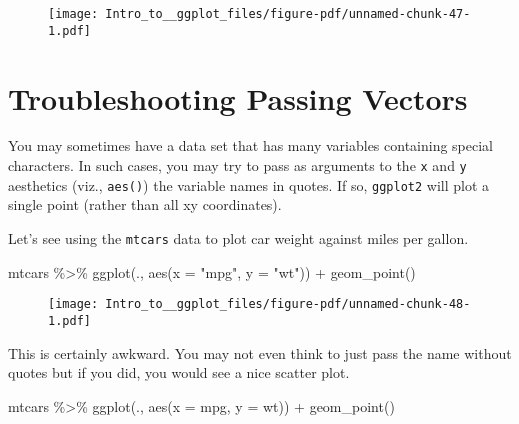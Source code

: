 \documentclass[
  letterpaper,
  DIV=11,
  numbers=noendperiod]{scrartcl}
\newenvironment{Shaded}{\begin{snugshade}}{\end{snugshade}}
\newcommand{\AttributeTok}[1]{\textcolor[rgb]{0.40,0.45,0.13}{#1}}
\newcommand{\FunctionTok}[1]{\textcolor[rgb]{0.28,0.35,0.67}{#1}}
\newcommand{\NormalTok}[1]{\textcolor[rgb]{0.00,0.23,0.31}{#1}}
\newcommand{\SpecialCharTok}[1]{\textcolor[rgb]{0.37,0.37,0.37}{#1}}
\newcommand{\StringTok}[1]{\textcolor[rgb]{0.13,0.47,0.30}{#1}}
\begin{document}
\begin{figure}[H]

{\centering \texttt{[image: Intro\_to\_\_ggplot\_files/figure-pdf/unnamed-chunk-47-1.pdf]}

}

\end{figure}

\hypertarget{troubleshooting-passing-vectors}{%
\section{\texorpdfstring{\textbf{Troubleshooting Passing
Vectors}}{Troubleshooting Passing Vectors}}\label{troubleshooting-passing-vectors}}

You may sometimes have a data set that has many variables containing
special characters. In such cases, you may try to pass as arguments to
the \texttt{x} and \texttt{y} aesthetics (viz., \texttt{aes()}) the
variable names in quotes. If so, \texttt{ggplot2} will plot a single
point (rather than all xy coordinates).

Let's see using the \texttt{mtcars} data to plot car weight against
miles per gallon.

\begin{Shaded}
\begin{Highlighting}[]
\NormalTok{mtcars }\SpecialCharTok{\%\textgreater{}\%}
    \FunctionTok{ggplot}\NormalTok{(., }
       \FunctionTok{aes}\NormalTok{(}\AttributeTok{x =} \StringTok{"mpg"}\NormalTok{, }\AttributeTok{y =} \StringTok{"wt"}\NormalTok{)) }\SpecialCharTok{+} \FunctionTok{geom\_point}\NormalTok{()}
\end{Highlighting}
\end{Shaded}

\begin{figure}[H]

{\centering \texttt{[image: Intro\_to\_\_ggplot\_files/figure-pdf/unnamed-chunk-48-1.pdf]}

}

\end{figure}

This is certainly awkward. You may not even think to just pass the name
without quotes but if you did, you would see a nice scatter plot.

\begin{Shaded}
\begin{Highlighting}[]
\NormalTok{mtcars }\SpecialCharTok{\%\textgreater{}\%}
    \FunctionTok{ggplot}\NormalTok{(., }
       \FunctionTok{aes}\NormalTok{(}\AttributeTok{x =}\NormalTok{ mpg, }\AttributeTok{y =}\NormalTok{ wt)) }\SpecialCharTok{+} \FunctionTok{geom\_point}\NormalTok{()}
\end{Highlighting}
\end{Shaded}
\end{document}

